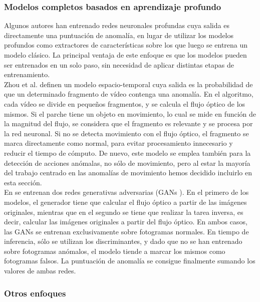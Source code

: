 \documentclass[../main.tex]{memoir}
\begin{document}
\subsubsection{Modelos completos basados en aprendizaje profundo}

Algunos autores han entrenado redes neuronales profundas cuya salida
es directamente una puntuación de anomalía, en lugar de utilizar los
modelos profundos como extractores de características sobre los que
luego se entrena un modelo clásico. La principal ventaja de este
enfoque es que los modelos pueden ser entrenados en un solo paso,
sin necesidad de aplicar distintas etapas de entrenamiento.\\

Zhou et al. \cite{zhou2016spatial} definen un modelo espacio-temporal
cuya salida es la probabilidad de que un determinado fragmento de
vídeo contenga una anomalía. En el algoritmo, cada vídeo se divide en
pequeños fragmentos, y se calcula el flujo óptico de los mismos. Si el
parche tiene un objeto en movimiento, lo cual se mide en función de la
magnitud del flujo, se considera que el fragmento es relevante y se
procesa por la red neuronal. Si no se detecta movimiento con el flujo
óptico, el fragmento se marca directamente como normal, para evitar
procesamiento innecesario y reducir el tiempo de cómputo. De nuevo,
este modelo se emplea también para la detección de acciones anómalas,
no sólo de movimiento, pero al estar la mayoría del trabajo centrado
en las anomalías de movimiento hemos decidido incluirlo en esta
sección.\\

En \cite{ravanbakhsh2019training} se entrenan dos redes generativas
adversarias (GANs \cite{goodfellow2014generative}). En el primero de
los modelos, el generador tiene que calcular el flujo óptico a partir
de las imágenes originales, mientras que en el segundo se tiene que
realizar la tarea inversa, es decir, calcular las imágenes originales
a partir del flujo óptico. En ambos casos, las GANs se entrenan
exclusivamente sobre fotogramas normales. En tiempo de inferencia,
sólo se utilizan los discriminantes, y dado que no se han entrenado
sobre fotogramas anómalos, el modelo tiende a marcar los mismos como
fotogramas falsos. La puntuación de anomalía se consigue finalmente
sumando los valores de ambas redes.

\subsubsection{Otros enfoques}
\end{document}
